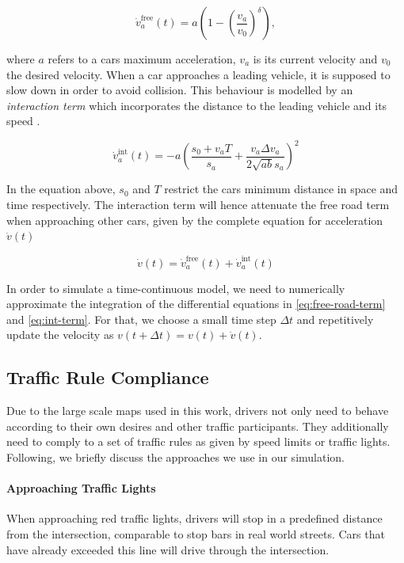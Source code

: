 \documentclass[10pt]{article}
\begin{document}
\begin{equation}
	\label{eq:free-road-term}
	\dot{v}_a^{\mathrm{free}}(t) = a ( 1 - ( \frac{v_a}{v_0} )^\delta),
\end{equation}

where $a$ refers to a cars maximum acceleration, $v_a$ is its current velocity and $v_0$ the desired velocity. When a car approaches a leading vehicle, it is supposed to slow down in order to avoid collision. This behaviour is modelled by an \textit{interaction term} which incorporates the distance to the leading vehicle and its speed \citep{treiber2000congested}. 

\begin{equation}
	\label{eq:int-term}
	\dot{v}_a^{\mathrm{int}}(t) = - a ( \frac{s_0 + v_a T}{s_a} + \frac{v_a \Delta v_a}{2 \sqrt{ab} s_a} )^2
\end{equation}

In the equation above, $s_0$ and $T$ restrict the cars minimum distance in space and time respectively. The interaction term will hence attenuate the free road term when approaching other cars, given by the complete equation for acceleration $\dot{v}(t)$

\begin{equation}
	\dot{v}(t) = \dot{v}_a^{\mathrm{free}}(t) + \dot{v}_a^{\mathrm{int}}(t)
\end{equation}

In order to simulate a time-continuous model, we need to numerically approximate the integration of the differential equations in \ref{eq:free-road-term} and \ref{eq:int-term}. For that, we choose a small time step $\Delta t$ and repetitively update the velocity as $v(t + \Delta t) = v(t) + \dot{v}(t)$.

\subsection{Traffic Rule Compliance}
Due to the large scale maps used in this work, drivers not only need to behave according to their own desires and other traffic participants. They additionally need to comply to a set of traffic rules as given by speed limits or traffic lights. Following, we briefly discuss the approaches we use in our simulation.

\paragraph{Approaching Traffic Lights} When approaching red traffic lights, drivers will stop in a predefined distance from the intersection, comparable to stop bars in real world streets. Cars that have already exceeded this line will drive through the intersection. 
\end{document}
